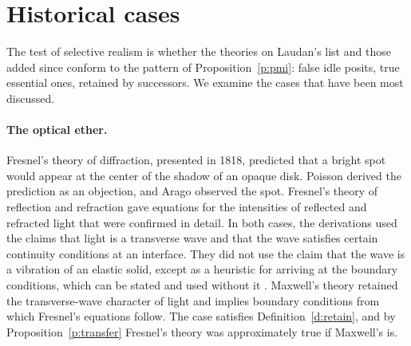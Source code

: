 \documentclass{situationist-preprint}
\begin{document}
\section{Historical cases}

The test of selective realism is whether the theories on Laudan's list and those added since conform to the pattern of Proposition~\ref{p:pmi}: false idle posits, true essential ones, retained by successors. We examine the cases that have been most discussed.

\paragraph{The optical ether.} Fresnel's theory of diffraction, presented in 1818, predicted that a bright spot would appear at the center of the shadow of an opaque disk. Poisson derived the prediction as an objection, and Arago observed the spot. Fresnel's theory of reflection and refraction gave equations for the intensities of reflected and refracted light that were confirmed in detail. In both cases, the derivations used the claims that light is a transverse wave and that the wave satisfies certain continuity conditions at an interface. They did not use the claim that the wave is a vibration of an elastic solid, except as a heuristic for arriving at the boundary conditions, which can be stated and used without it \citep{Worrall1989,Psillos1999}. Maxwell's theory retained the transverse-wave character of light and implies boundary conditions from which Fresnel's equations follow. The case satisfies Definition~\ref{d:retain}, and by Proposition~\ref{p:transfer} Fresnel's theory was approximately true if Maxwell's is.
\end{document}
